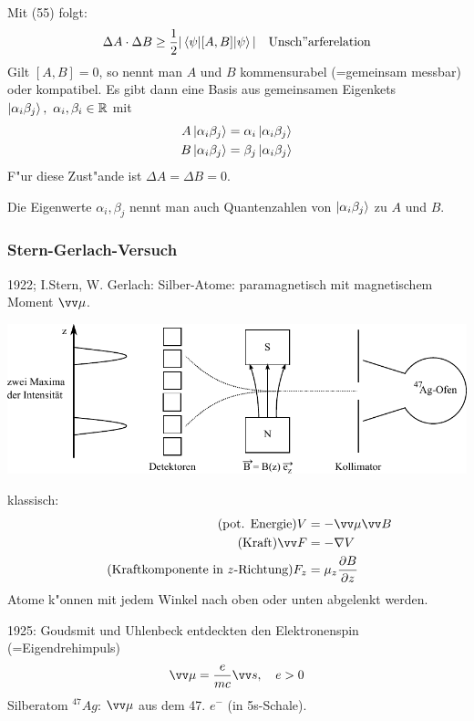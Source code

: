 \documentclass[a4paper]{scrartcl}
\newcommand{\RR}{\ensuremath \mathbb{R}}
\begin{document}
{Mit (55) folgt:
\begin{align} \Delta A \cdot \Delta B \geq \frac12 \vert \braket{ \psi | [A,B] | \psi } \vert \quad \mathrm{Unsch"arferelation} \end{align}
Gilt $[A,B] = 0$, so nennt man $A$ und $B$ kommensurabel (=gemeinsam messbar) oder kompatibel. Es gibt dann eine Basis aus gemeinsamen Eigenkets $\ket { \alpha_i \beta_j }, \ \alpha_i, \beta_i \in \RR$ mit
\begin{align*}
A \ket{ \alpha_i \beta_j } & = \alpha_i \ket{ \alpha_i \beta_j } \\
B \ket{ \alpha_i \beta_j } & = \beta_j \ket{ \alpha_i \beta_j}
\end{align*}
F"ur diese Zust"ande ist $\Delta A = \Delta B = 0$. 

Die Eigenwerte $\alpha_i, \beta_j$ nennt man auch Quantenzahlen von $\ket{ \alpha_i \beta_j}$ zu $A$ und $B$.

\subsubsection*{Stern-Gerlach-Versuch}

1922; I.Stern, W. Gerlach: Silber-Atome: paramagnetisch mit magnetischem Moment $\vv \mu$.
\begin{center}
\includegraphics{056SternGerlach}
\end{center}
klassisch:
\begin{align*}
\tag{pot. Energie}  V & = - \vv \mu \vv B\\
\tag{Kraft}  \vv F & = - \nabla V \\
\tag{Kraftkomponente in $z$-Richtung} F_z & = \mu_z \frac {\partial B}{\partial z}
\end{align*}
Atome k"onnen mit jedem Winkel nach oben oder unten abgelenkt werden.

1925: Goudsmit und Uhlenbeck entdeckten den Elektronenspin (=Eigendrehimpuls)
\begin{align}
\vv \mu  = \frac{e}{mc} \vv s, \quad e>0
\end{align}
Silberatom $^{47}Ag$: $\vv \mu$ aus dem 47. $e^-$ (in 5s-Schale).

}
\end{document}
